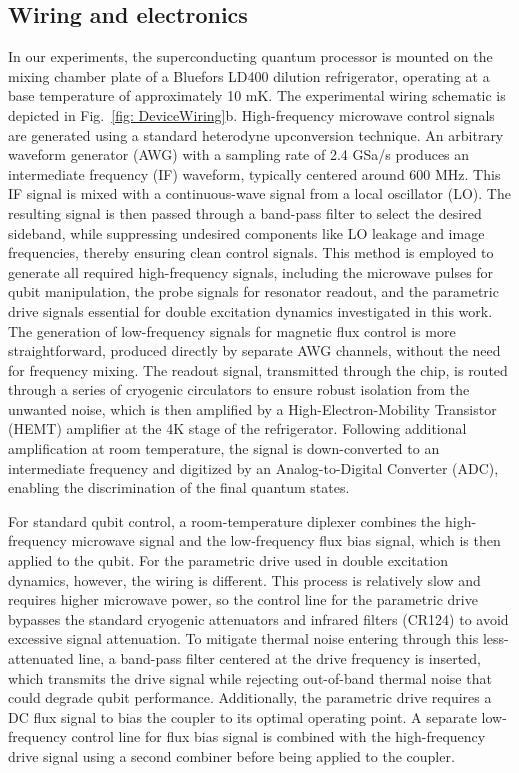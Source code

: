 \documentclass[aps,prl,epsfigure,twocolumn,superscriptaddress]{revtex4-2}
\newcommand{\1}{\mathbbm{1}}
\newcommand{\SubFig}[2]{\ref{#1}{\color{blue}#2}}
\begin{document}
\subsection{Wiring and electronics}
In our experiments, the superconducting quantum processor is mounted on the mixing chamber plate of a Bluefors LD400 dilution refrigerator, operating at a base temperature of approximately 10 mK.
The experimental wiring schematic is depicted in Fig.~\SubFig{fig: DeviceWiring}{b}. High-frequency microwave control signals are generated using a standard heterodyne upconversion technique. An arbitrary waveform generator (AWG) with a sampling rate of 2.4 GSa/s produces an intermediate frequency (IF) waveform, typically centered around 600 MHz. This IF signal is mixed with a continuous-wave signal from a local oscillator (LO). The resulting signal is then passed through a band-pass filter to select the desired sideband, while suppressing undesired components like LO leakage and image frequencies, thereby ensuring clean control signals.
This method is employed to generate all required high-frequency signals, including the microwave pulses for qubit manipulation, the probe signals for resonator readout, and the parametric drive signals essential for double excitation dynamics investigated in this work. The generation of low-frequency signals for magnetic flux control is more straightforward, produced directly by separate AWG channels, without the need for frequency mixing.
The readout signal, transmitted through the chip, is routed through a series of cryogenic circulators to ensure robust isolation from the unwanted noise, which is then amplified by a High-Electron-Mobility Transistor (HEMT) amplifier at the 4K stage of the refrigerator. Following additional amplification at room temperature, the signal is down-converted to an intermediate frequency and digitized by an Analog-to-Digital Converter (ADC), enabling the discrimination of the final quantum states.




For standard qubit control, a room-temperature diplexer combines the high-frequency microwave signal and the low-frequency flux bias signal, which is then applied to the qubit.
For the parametric drive used in double excitation dynamics, however, the wiring is different. This process is relatively slow and requires higher microwave power, so the control line for the parametric drive bypasses the standard cryogenic attenuators and infrared filters (CR124) to avoid excessive signal attenuation. To mitigate thermal noise entering through this less-attenuated line, a band-pass filter centered at the drive frequency is inserted, which transmits the drive signal while rejecting out-of-band thermal noise that could degrade qubit performance.
Additionally, the parametric drive requires a DC flux signal to bias the coupler to its optimal operating point. A separate low-frequency control line for flux bias signal is combined with the high-frequency drive signal using a second combiner before being applied to the coupler.
\end{document}
